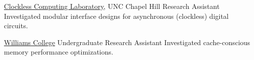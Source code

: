 		{\href{http://www.cs.unc.edu/~montek/}{Clockless Computing Laboratory}, UNC Chapel Hill}
		{Research Assistant}
		{}{}
		{Investigated modular interface designs for asynchronous (clockless) digital circuits.}

		{\href{http://www.williams.edu}{Williams College}}
		{Undergraduate Research Assistant}
		{}{}
		{Investigated cache-conscious memory performance optimizations.}

